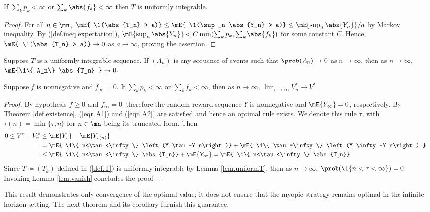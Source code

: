 \documentclass[11pt]{article}
\begin{document}
\begin{lemma}\label{lem.uniformT}
	If  $\sum_k p_k< \infty$ or $\sum_k \abs{f_k}< \infty$ then $T$ is uniformly integrable.
\end{lemma}
\begin{proof}
	For all $n \in \mn$,  $\mE{ \1(\abs{T_n} > a)} \le \mE{ \1(\sup_n \abs{Y_n} > a)} \le  {\mE{ {\sup_n \abs{Y_n}}}}/{a}$ by Markov inequality. By (\ref{def.ineq.expectation}),  $\mE{\sup_n \abs{Y_n}} < C\min( \sum_k p_k, \sum_k \abs{f_k})$ for some constant $C$. Hence, $\mE{ \1(\abs{T_n} > a)} \to 0$  as $a \to \infty$, proving the assertion.
\end{proof}
\begin{lemma}\label{lem.vanish}
	Suppose $T$ is a uniformly integrable sequence. If $(A_n)$ is any sequence of  events such that $\prob(A_n )\to 0$ as $n \to \infty$, then as $n \to \infty$, $\mE{\1\{ A_n\} \abs{T_n} } \to 0$.
\end{lemma}



\begin{thm}\label{thm.convergence}
	Suppose $f$ is nonnegative and $f_\infty=0$. 
If  $\sum_k p_k< \infty$ or $\sum_k {f_k}< \infty$, then	as $n \to \infty$, $\lim_{n \to \infty} V^*_n \to V^*$.
\end{thm}
\begin{proof}
	By hypothesis $f \ge 0$ and $f_\infty = 0$, therefore the random reward sequence $Y$ is nonnegative and 
	$\mE{Y_\infty} = 0$, respectively. By Theorem \ref{def.existence},   (\ref{eqn.A1}) and (\ref{eqn.A2}) are satisfied and hence an optimal rule exists.  We denote this rule $\tau$, with $\tau(n)=\min \{\tau, n\}$ for $n \in \mn$ being its  truncated form. Then
	$$
	\begin{aligned}
		0 \leq V^*-V^*_n & \leq \mE{Y_\tau}-\mE{ Y_{\tau(n)}} \\
		& =\mE{ \1\{ n<\tau<\infty\} \left(Y_\tau-Y_n\right)} +\mE{ \1\{ \tau=\infty\} \left(Y_\infty-Y_n\right) } \\
		& \le \mE{ \1\{ n<\tau<\infty\} \abs{T_n}} +\mE{Y_\infty} = \mE{ \1\{ n<\tau<\infty\} \abs{T_n}} 
	\end{aligned}
	$$
Since  $T \coloneqq (T_k)$ defined in (\ref{def.T})  is uniformly integrable  by Lemma \ref{lem.uniformT}, then
as $n \to \infty$, $\prob(\1\{ n<\tau<\infty\}) = 0$. Invoking Lemma \ref{lem.vanish} concludes the proof.
\end{proof}%
This result demonstrates only convergence of the optimal value; it does not ensure that the myopic strategy remains optimal in the infinite-horizon setting. The next theorem and  its corollary furnish this guarantee.
\end{document}
